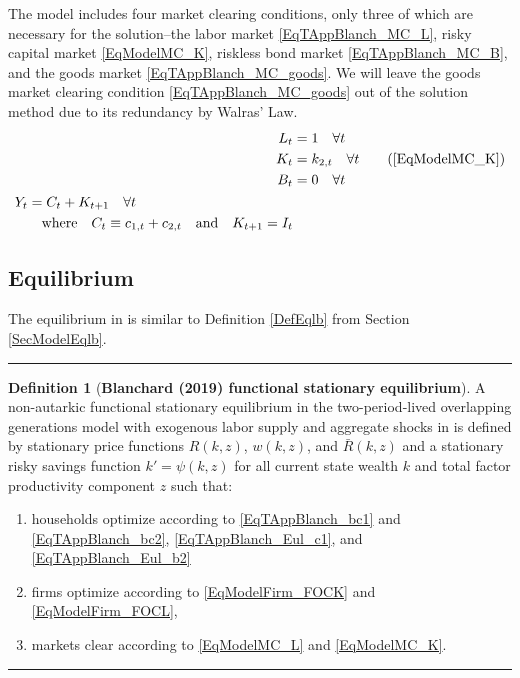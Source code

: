 \documentclass[letterpaper,12pt]{article}
\theoremstyle{definition}
\newtheorem{definition}{Definition} %
\begin{document}
    The model includes four market clearing conditions, only three of which are necessary for the solution--the labor market \eqref{EqTAppBlanch_MC_L}, risky capital market \eqref{EqModelMC_K}, riskless bond market \eqref{EqTAppBlanch_MC_B}, and the goods market \eqref{EqTAppBlanch_MC_goods}. We will leave the goods market clearing condition \eqref{EqTAppBlanch_MC_goods} out of the solution method due to its redundancy by Walras' Law.
    \begin{align}
      L_t &= 1 \quad\forall t \label{EqTAppBlanch_MC_L} \\
      K_t &= k_{2,t} \quad\forall t \tag{\ref{EqModelMC_K}} \\
      B_t &= 0 \quad\forall t \label{EqTAppBlanch_MC_B} \\
      \begin{split}
        Y_t &= C_t + K_{t+1} \quad\forall t \\
        &\quad\text{where}\quad C_t\equiv c_{1,t} + c_{2,t} \quad\text{and}\quad K_{t+1} = I_t
      \end{split} \label{EqTAppBlanch_MC_goods}
    \end{align}


  \subsection{Equilibrium}\label{SecTAppBlanchEqlb}

    The equilibrium in \citet{Blanchard:2019} is similar to Definition \ref{DefEqlb} from Section \ref{SecModelEqlb}.

    \vspace{5mm}
    \hrule
    \vspace{-1mm}
    \begin{definition}[\textbf{Blanchard (2019) functional stationary equilibrium}]\label{DefTAppBlanchEqlb}
      A non-autarkic functional stationary equilibrium in the two-period-lived overlapping generations model with exogenous labor supply and aggregate shocks in \citet{Blanchard:2019} is defined by stationary price functions $R(k,z)$, $w(k,z)$, and $\bar{R}(k,z)$ and a stationary risky savings function $k'=\psi(k,z)$ for all current state wealth $k$ and total factor productivity component $z$ such that:
      \begin{enumerate}
        \item households optimize according to \eqref{EqTAppBlanch_bc1} and \eqref{EqTAppBlanch_bc2}, \eqref{EqTAppBlanch_Eul_c1}, and \eqref{EqTAppBlanch_Eul_b2}
        \item firms optimize according to \eqref{EqModelFirm_FOCK} and \eqref{EqModelFirm_FOCL},
        \item markets clear according to \eqref{EqModelMC_L} and \eqref{EqModelMC_K}.
      \end{enumerate}
    \end{definition}
    \vspace{-2mm}
    \hrule
    \vspace{5mm}
\end{document}

